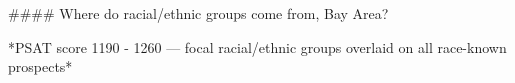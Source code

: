 #### Where do racial/ethnic groups come from, Bay Area?

*PSAT score 1190 - 1260 — focal racial/ethnic groups overlaid on all race-known prospects*
